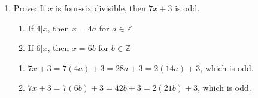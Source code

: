 \documentclass{article}
\begin{document}
\begin{enumerate}
\begin{enumerate}[label=\Alph*.]
            \item Prove: If $x$ is four-six divisible, then $7x + 3$ is odd.
            \begin{enumerate}[label=Case \arabic*:]
                \item If $4|x$, then $x = 4a$ for $a \in \mathbb{Z}$
                \item If $6|x$, then $x = 6b$ for $b \in \mathbb{Z}$
            \end{enumerate}
            \begin{enumerate}[label=Proof \arabic*:]
                \item $7x + 3 = 7(4a) + 3 = 28a + 3 = 2(14a) + 3$, which is odd.
                \item $7x + 3 = 7(6b) + 3 = 42b + 3 = 2(21b) + 3$, which is odd.
            \end{enumerate}
        \end{enumerate}
\end{enumerate}
\end{document}
